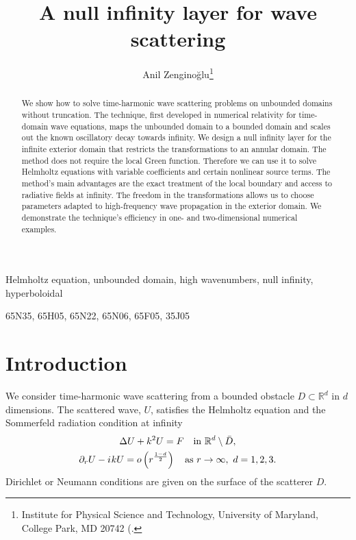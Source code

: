 \documentclass[final,onefignum,onetabnum]{siamart190516}
\title{A null infinity layer for wave scattering}
\author{Anil Zengino\u{g}lu\thanks{Institute for Physical Science and Technology, University of Maryland, College Park, MD 20742
  (\email{anil@umd.edu)}.}}
\date{}
\newcommand{\iu}{{i\mkern1mu}}
\begin{document}
\maketitle

\begin{abstract}
We show how to solve time-harmonic wave scattering problems on unbounded domains without truncation. The technique, first developed in numerical relativity for time-domain wave equations, maps the unbounded domain to a bounded domain and scales out the known oscillatory decay towards infinity. We design a null infinity layer for the infinite exterior domain that restricts the transformations to an annular domain. The method does not require the local Green function. Therefore we can use it to solve Helmholtz equations with variable coefficients and certain nonlinear source terms. The method's main advantages are the exact treatment of the local boundary and access to radiative fields at infinity. The freedom in the transformations allows us to choose parameters adapted to high-frequency wave propagation in the exterior domain. We demonstrate the technique's efficiency in one- and two-dimensional numerical examples.
\end{abstract}

\begin{keywords}
	Helmholtz equation, unbounded domain, high wavenumbers, null infinity, hyperboloidal
\end{keywords}

\begin{AMS}
	65N35, %
	65H05, %
	65N22, %
	65N06, %
	65F05, %
	35J05  %
\end{AMS}


\section{Introduction}

We consider time-harmonic wave scattering from a bounded obstacle $D \subset \mathbb{R}^d$ in $d$ dimensions. The scattered wave, $U$, satisfies the Helmholtz equation and the Sommerfeld radiation condition at infinity
\begin{equation}
	\label{eq:helm}
	\begin{gathered}
		\Delta U + k^2 U = F \quad \mathrm{in } \ \mathbb{R}^d\setminus \bar{D}, \\
		\partial_r U - \iu k U = o\left(r^{\frac{1-d}{2}}\right) \quad \mathrm{as} \ r\to\infty,\ d=1,2,3.
	\end{gathered}
\end{equation}
Dirichlet or Neumann conditions are given on the surface of the scatterer $D$.
\end{document}
